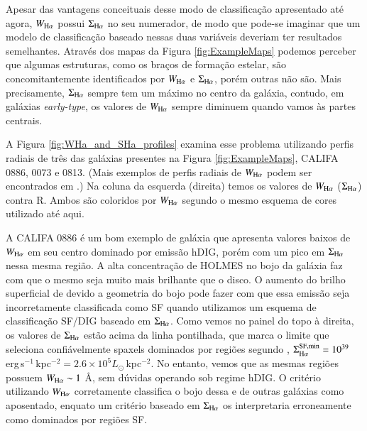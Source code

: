 Apesar das vantagens conceituais desse modo de classificação apresentado até agora, $W_{\Ha}$ possui $\Sigma_{\Ha}$ no seu numerador, de modo que pode-se imaginar que um modelo de classificação baseado nessas duas variáveis deveriam ter resultados semelhantes. Através dos mapas da Figura \ref{fig:ExampleMaps} podemos perceber que algumas estruturas, como os braços de formação estelar, são concomitantemente identificados por $W_{\Ha}$ e $\Sigma_{\Ha}$, porém outras não são. Mais precisamente, $\Sigma_{\Ha}$ sempre tem um máximo no centro da galáxia, contudo, em galáxias {\em early-type}, os valores de $W_{\Ha}$ sempre diminuem quando vamos às partes centrais.

A Figura \ref{fig:WHa_and_SHa_profiles} examina esse problema utilizando perfis radiais de três das galáxias presentes na Figura \ref{fig:ExampleMaps}, CALIFA 0886, 0073 e 0813. (Mais exemplos de perfis radiais de $W_{\Ha}$ podem ser encontrados em \citealt{Papaderos.etal.2013, Belfiore.etal.2016, Belfiore.etal.2017, Gomes.etal.2016b, GonzalezDelgado.etal.2016a}.) Na coluna da esquerda (direita) temos os valores de $W_{\Ha}$ ($\Sigma_{\Ha}$) contra R. Ambos são coloridos por $W_{\Ha}$ segundo o mesmo esquema de cores utilizado até aqui.

A CALIFA 0886 é um bom exemplo de galáxia que apresenta valores baixos de $W_{\Ha}$ em seu centro dominado por emissão hDIG, porém com um pico em $\Sigma_{\Ha}$ nessa mesma região. A alta concentração de HOLMES no bojo da galáxia faz com que o mesmo seja muito mais brilhante que o disco. O aumento do brilho superficial de \Ha devido a geometria do bojo pode fazer com que essa emissão seja incorretamente classificada como SF quando utilizamos um esquema de classificação SF/DIG baseado em $\Sigma_{\Ha}$. Como vemos no painel do topo à direita, os valores de $\Sigma_{\Ha}$ estão acima da linha pontilhada, que marca o limite que seleciona confiávelmente spaxels dominados por regiões \hii segundo \citet{Zhang.etal.2017a}, $\Sigma^{\rm SF,min}_{\Ha} = 10^{39}$ erg$\,$s$^{-1}\,$kpc$^{-2} =  2.6 \times 10^{5} L_\odot\,$kpc$^{-2}$. No entanto, vemos que as mesmas regiões possuem $W_{\Ha} \sim 1$ \AA, sem dúvidas operando sob regime hDIG. O critério utilizando $W_{\Ha}$ corretamente classifica o bojo dessa e de outras galáxias como aposentado, enquato um critério baseado em $\Sigma_{\Ha}$ os interpretaria erroneamente como dominados por regiões SF.

